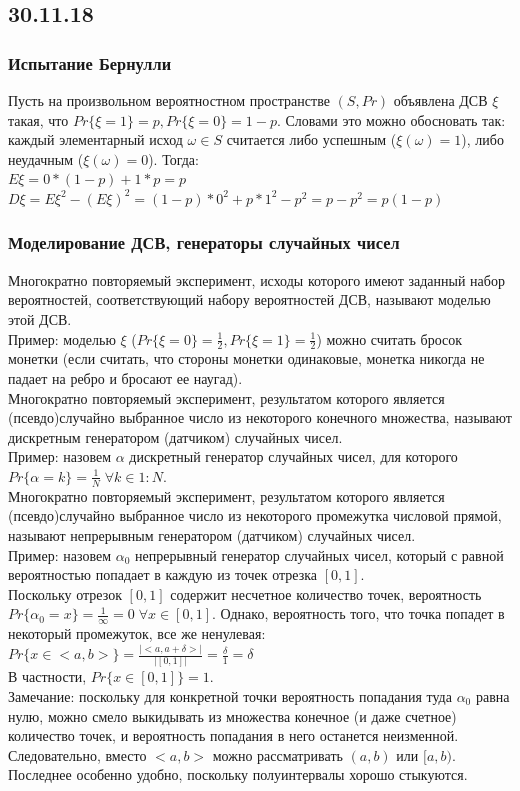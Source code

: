 \subsection{30.11.18}
\subsubsection{Испытание Бернулли}
Пусть на произвольном вероятностном пространстве $(S, Pr)$ объявлена ДСВ $\xi$ такая, что $Pr\{\xi = 1\} = p, Pr\{\xi = 0\} = 1 - p$. Словами это можно обосновать так: каждый элементарный исход $\omega \in S$ считается либо успешным ($\xi(\omega) = 1$), либо неудачным ($\xi(\omega) = 0$). Тогда:\\
$E \xi = 0 * (1 - p) + 1 * p = p$\\
$D \xi = E \xi^2 - (E \xi)^2 = (1 - p) * 0^2 + p * 1^2 - p^2 = p - p^2 = p(1 - p)$
\subsubsection{Моделирование ДСВ, генераторы случайных чисел}
Многократно повторяемый эксперимент, исходы которого имеют заданный набор вероятностей, соответствующий набору вероятностей ДСВ, называют моделью этой ДСВ.\\
Пример: моделью $\xi$ ($Pr\{\xi = 0\} = \frac{1}{2}, Pr\{\xi = 1\} = \frac{1}{2}$) можно считать бросок монетки (если считать, что стороны монетки одинаковые, монетка никогда не падает на ребро и бросают ее наугад).\\
Многократно повторяемый эксперимент, результатом которого является (псевдо)случайно выбранное число из некоторого конечного множества, называют дискретным генератором (датчиком) случайных чисел.\\
Пример: назовем $\alpha$ дискретный генератор случайных чисел, для которого $Pr\{\alpha = k\} = \frac{1}{N} \; \forall k \in 1:N$.\\
Многократно повторяемый эксперимент, результатом которого является (псевдо)случайно выбранное число из некоторого промежутка числовой прямой, называют непрерывным генератором (датчиком) случайных чисел.\\
Пример: назовем $\alpha_0$ непрерывный генератор случайных чисел, который с равной вероятностью попадает в каждую из точек отрезка $[0, 1]$.\\
Поскольку отрезок $[0, 1]$ содержит несчетное количество точек, вероятность $Pr\{\alpha_0 = x\} = \frac{1}{\infty} = 0 \; \forall x \in [0, 1]$. Однако, вероятность того, что точка попадет в некоторый промежуток, все же ненулевая:\\
$Pr\{x \in <a, b>\} = \frac{|<a, a + \delta>|}{|[0, 1]|} = \frac{\delta}{1} = \delta$\\
В частности, $Pr\{x \in [0, 1]\} = 1$.\\
Замечание: поскольку для конкретной точки вероятность попадания туда $\alpha_0$ равна нулю, можно смело выкидывать из множества конечное (и даже счетное) количество точек, и вероятность попадания в него останется неизменной. Следовательно, вместо $<a, b>$ можно рассматривать $(a, b)$ или $[a, b)$. Последнее особенно удобно, поскольку полуинтервалы хорошо стыкуются.
